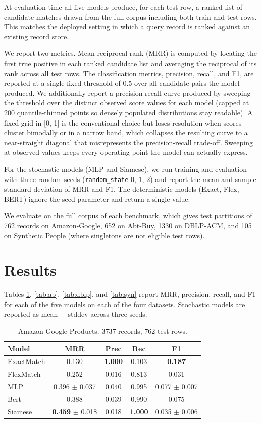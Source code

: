 \documentclass[10pt,letterpaper]{article}
\begin{document}
At evaluation time all five models produce, for each test row, a
ranked list of candidate matches drawn from the full corpus including
both train and test rows. This matches the deployed setting in which a
query record is ranked against an existing record store.

We report two metrics. Mean reciprocal rank (MRR) is computed by
locating the first true positive in each ranked candidate list and
averaging the reciprocal of its rank across all test rows. The
classification metrics, precision, recall, and F1, are reported at a
single fixed threshold of 0.5 over all candidate pairs the model
produced. We additionally report a precision-recall curve produced
by sweeping the threshold over the distinct observed score values
for each model (capped at 200 quantile-thinned points so densely
populated distributions stay readable). A fixed grid in [0, 1] is
the conventional choice but loses resolution when scores cluster
bimodally or in a narrow band, which collapses the resulting curve
to a near-straight diagonal that misrepresents the precision-recall
trade-off. Sweeping at observed values keeps every operating point
the model can actually express.

For the stochastic models (MLP and Siamese), we run training and
evaluation with three random seeds (\texttt{random\_state} 0, 1, 2)
and report the mean and sample standard deviation of MRR and F1. The
deterministic models (Exact, Flex, BERT) ignore the seed parameter and
return a single value.

We evaluate on the full corpus of each benchmark, which gives test
partitions of 762 records on Amazon-Google, 652 on Abt-Buy, 1330 on
DBLP-ACM, and 105 on Synthetic People (where singletons are not
eligible test rows).

\section{Results}
\label{sec:results}

Tables \ref{tab:ag}, \ref{tab:ab}, \ref{tab:dblp}, and \ref{tab:syn}
report MRR, precision, recall, and F1 for each of the five models on
each of the four datasets. Stochastic models are reported as mean
$\pm$ stddev across three seeds.

\begin{table}[t]
\centering
\caption{Amazon-Google Products. 3737 records, 762 test rows.}
\label{tab:ag}
\small
\begin{tabular}{lcccc}
\toprule
Model & MRR & Prec & Rec & F1 \\
\midrule
ExactMatch & 0.130 & \textbf{1.000} & 0.103 & \textbf{0.187} \\
FlexMatch  & 0.252 & 0.016 & 0.813 & 0.031 \\
MLP        & 0.396 \scriptsize{$\pm$ 0.037} & 0.040 & 0.995 & 0.077 \scriptsize{$\pm$ 0.007} \\
Bert       & 0.388 & 0.039 & 0.990 & 0.075 \\
Siamese    & \textbf{0.459} \scriptsize{$\pm$ 0.018} & 0.018 & \textbf{1.000} & 0.035 \scriptsize{$\pm$ 0.006} \\
\bottomrule
\end{tabular}
\end{table}
\end{document}

